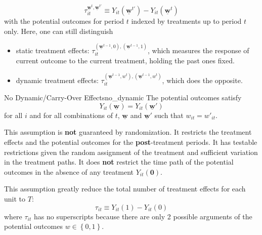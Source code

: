 \documentclass[twoside]{article}
\begin{document}
\begin{equation*}
    \tau^{\underline{\mathbf{w}}^t,\underline{\mathbf{w}}^{t'}}_{it} \equiv Y_{it}\left(\underline{\mathbf{w}}^{t'}\right) - Y_{it}\left(\underline{\mathbf{w}}^t\right)
\end{equation*}
with the potential outcomes for period $t$ indexed by treatments up to period $t$ only. Here, one can still distinguish
\begin{itemize}
    \item static treatment effects: $\tau_{it}^{\left(\underline{\mathbf{w}}^{t-1},0\right),\left(\underline{\mathbf{w}}^{t-1},1\right)}$, which measures the response of current outcome to the current treatment, holding the past ones fixed.
    \item dynamic treatment effects: $\tau_{it}^{\left(\underline{\mathbf{w}}^{t-1},w^t\right),\left(\underline{\mathbf{w}}^{t-1},w^t\right)}$, which does the opposite.
\end{itemize}

\begin{assumption}{No Dynamic/Carry-Over Effects}{no_dynamic}
    The potential outcomes satisfy $$ Y_{it}\left(\underline{\mathbf{w}}\right) = Y_{it}\left(\underline{\mathbf{w}}'\right) $$
    for all $i$ and for all combinations of $t$, $\underline{\mathbf{w}}$ and $\underline{\mathbf{w}}'$ such that $w_{it}=w'_{it}$.
\end{assumption}
This assumption is \textbf{not} guaranteed by randomization. It restricts the treatment effects and the potential outcomes for the \textbf{post}-treatment periods.
It has testable restrictions given the random assignment of the treatment and sufficient variation in the treatment paths. It does \textbf{not} restrict the time path of the potential outcomes in the absence of any treatment $Y_{it}\left(\mathbf{0}\right)$.

This assumption greatly reduce the total number of treatment effects for each unit to $T$:
$$ \tau_{it}\equiv Y_{it}(1) - Y_{it}(0)$$
where $\tau_{it}$ has no superscripts because there are only 2 possible arguments of the potential outcomes $w\in \left\{0,1\right\}$.
\end{document}
